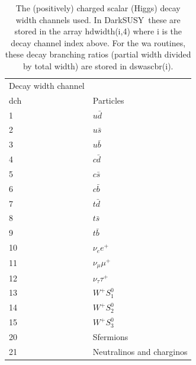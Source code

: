 \documentclass[a4paper,10pt,oneside]{book}
\newcommand{\code}[1]{\ft{#1}}
\newcommand{\ds}{{\sffamily DarkSUSY}}
\newcommand{\ft}[1]{\textsf{#1}}
\begin{document}
\begin{table}
\begin{tabular}{ll}
Decay width channel &  \\
\code{dch} & Particles \\ \hline
1 & $u \bar{d}$ \\
2 & $u \bar{s}$ \\
3 & $u \bar{b}$ \\
4 & $c \bar{d}$ \\
5 & $c \bar{s}$ \\
6 & $c \bar{b}$ \\
7 & $t \bar{d}$ \\
8 & $t \bar{s}$ \\
9 & $t \bar{b}$ \\
10 & $\nu_e e^+$ \\
11 & $\nu_\mu \mu^+$ \\
12 & $\nu_\tau \tau^+$ \\
13 & $W^+ S_1^0$ \\
14 & $W^+ S_2^0$ \\
15 & $W^+ S_3^0$ \\
20 & Sfermions \\
21 & Neutralinos and charginos\\
\end{tabular}
\caption{The (positively) charged scalar (Higgs) decay width channels used. In \ds\, these are stored in the array \code{hdwidth(i,4)} where \code{i} is the decay channel index above. For the \code{wa} routines, these decay branching ratios (partial width divided by total width) are stored in \code{dswascbr(i)}.
 \label{tab:hdecay+}}
\end{table}
\end{document}

